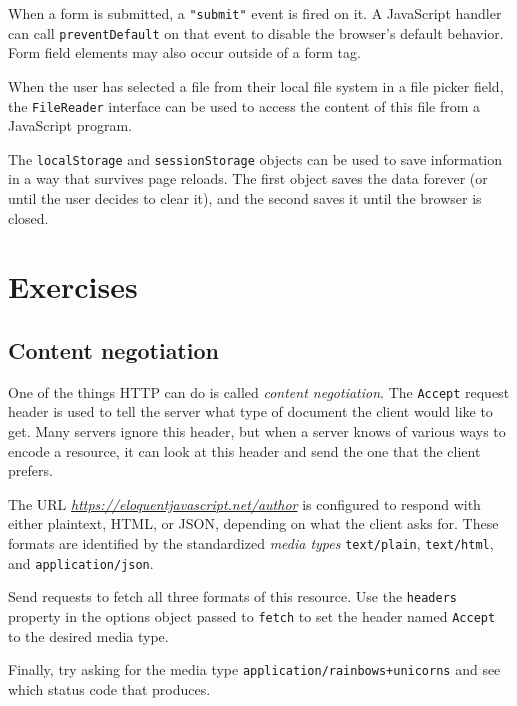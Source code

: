 When a form is submitted, a \lstinline`"submit"` event is fired on it. A JavaScript handler can call \lstinline`preventDefault` on that event to disable the browser's default behavior. Form field elements may also occur outside of a form tag.

When the user has selected a file from their local file system in a file picker field, the \lstinline`FileReader` interface can be used to access the content of this file from a JavaScript program.

The \lstinline`localStorage` and \lstinline`sessionStorage` objects can be used to save information in a way that survives page reloads. The first object saves the data forever (or until the user decides to clear it), and the second saves it until the browser is closed.

\section{Exercises}

\subsection{Content negotiation}

One of the things HTTP can do is called \emph{content negotiation}. The \lstinline`Accept` request header is used to tell the server what type of document the client would like to get. Many servers ignore this header, but when a server knows of various ways to encode a resource, it can look at this header and send the one that the client prefers.

The URL \href{https://eloquentjavascript.net/author}{\emph{https://eloquentjavascript.net\slash author}} is configured to respond with either plaintext, HTML, or JSON, depending on what the client asks for. These formats are identified by the standardized \emph{media types} \lstinline`text/plain`, \lstinline`text/html`, and \lstinline`application/json`.

Send requests to fetch all three formats of this resource. Use the \lstinline`headers` property in the options object passed to \lstinline`fetch` to set the header named \lstinline`Accept` to the desired media type.

Finally, try asking for the media type \lstinline`application/rainbows+unicorns` and see which status code that produces.

